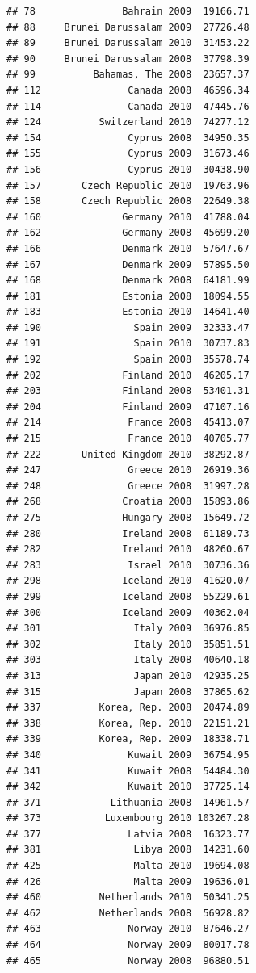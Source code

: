 \documentclass{article}\usepackage[]{graphicx}\usepackage[]{color}
\makeatletter
\newenvironment{kframe}{%
 \def\at@end@of@kframe{}%
 \ifinner\ifhmode%
  \def\at@end@of@kframe{\end{minipage}}%
  \begin{minipage}{\columnwidth}%
 \fi\fi%
 \def\FrameCommand##1{\hskip\@totalleftmargin \hskip-\fboxsep
 \colorbox{shadecolor}{##1}\hskip-\fboxsep
     \hskip-\linewidth \hskip-\@totalleftmargin \hskip\columnwidth}%
 \MakeFramed {\advance\hsize-\width
   \@totalleftmargin\z@ \linewidth\hsize
   \@setminipage}}%
 {\par\unskip\endMakeFramed%
 \at@end@of@kframe}
\newenvironment{knitrout}{}{} %
\makeatother
\begin{document}
\begin{knitrout}
\begin{kframe}
\begin{verbatim}
## 78               Bahrain 2009  19166.71
## 88     Brunei Darussalam 2009  27726.48
## 89     Brunei Darussalam 2010  31453.22
## 90     Brunei Darussalam 2008  37798.39
## 99          Bahamas, The 2008  23657.37
## 112               Canada 2008  46596.34
## 114               Canada 2010  47445.76
## 124          Switzerland 2010  74277.12
## 154               Cyprus 2008  34950.35
## 155               Cyprus 2009  31673.46
## 156               Cyprus 2010  30438.90
## 157       Czech Republic 2010  19763.96
## 158       Czech Republic 2008  22649.38
## 160              Germany 2010  41788.04
## 162              Germany 2008  45699.20
## 166              Denmark 2010  57647.67
## 167              Denmark 2009  57895.50
## 168              Denmark 2008  64181.99
## 181              Estonia 2008  18094.55
## 183              Estonia 2010  14641.40
## 190                Spain 2009  32333.47
## 191                Spain 2010  30737.83
## 192                Spain 2008  35578.74
## 202              Finland 2010  46205.17
## 203              Finland 2008  53401.31
## 204              Finland 2009  47107.16
## 214               France 2008  45413.07
## 215               France 2010  40705.77
## 222       United Kingdom 2010  38292.87
## 247               Greece 2010  26919.36
## 248               Greece 2008  31997.28
## 268              Croatia 2008  15893.86
## 275              Hungary 2008  15649.72
## 280              Ireland 2008  61189.73
## 282              Ireland 2010  48260.67
## 283               Israel 2010  30736.36
## 298              Iceland 2010  41620.07
## 299              Iceland 2008  55229.61
## 300              Iceland 2009  40362.04
## 301                Italy 2009  36976.85
## 302                Italy 2010  35851.51
## 303                Italy 2008  40640.18
## 313                Japan 2010  42935.25
## 315                Japan 2008  37865.62
## 337          Korea, Rep. 2008  20474.89
## 338          Korea, Rep. 2010  22151.21
## 339          Korea, Rep. 2009  18338.71
## 340               Kuwait 2009  36754.95
## 341               Kuwait 2008  54484.30
## 342               Kuwait 2010  37725.14
## 371            Lithuania 2008  14961.57
## 373           Luxembourg 2010 103267.28
## 377               Latvia 2008  16323.77
## 381                Libya 2008  14231.60
## 425                Malta 2010  19694.08
## 426                Malta 2009  19636.01
## 460          Netherlands 2010  50341.25
## 462          Netherlands 2008  56928.82
## 463               Norway 2010  87646.27
## 464               Norway 2009  80017.78
## 465               Norway 2008  96880.51

\end{verbatim}
\end{kframe}
\end{knitrout}
\end{document}
